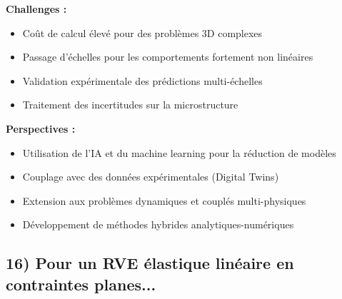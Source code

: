 \documentclass{rapportECL}
\begin{document}
\begin{tcolorbox}[colback=white!5!white,colframe=blue!75!black]
\textbf{Challenges :}
\begin{itemize}[noitemsep]
\item Coût de calcul élevé pour des problèmes 3D complexes
\item Passage d'échelles pour les comportements fortement non linéaires
\item Validation expérimentale des prédictions multi-échelles
\item Traitement des incertitudes sur la microstructure
\end{itemize}

\textbf{Perspectives :}
\begin{itemize}[noitemsep]
\item Utilisation de l'IA et du machine learning pour la réduction de modèles
\item Couplage avec des données expérimentales (Digital Twins)
\item Extension aux problèmes dynamiques et couplés multi-physiques
\item Développement de méthodes hybrides analytiques-numériques
\end{itemize}
\end{tcolorbox}

\subsection*{16) Pour un RVE élastique linéaire en contraintes planes...}
\end{document}
